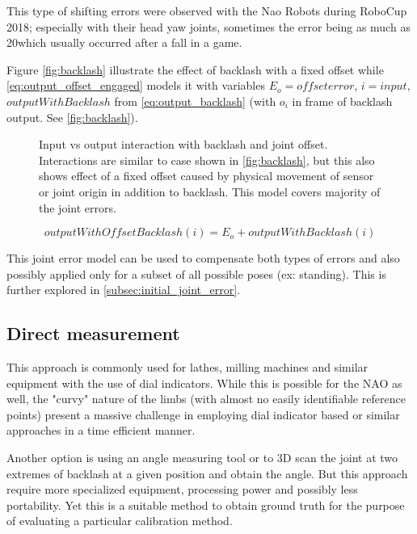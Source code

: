 \documentclass[english, printversion, nomenclature, notitle]{tuvisionthesis} %
\begin{document}
This type of shifting errors were observed with the Nao Robots during RoboCup 2018; especially with their head yaw joints, sometimes the error being as much as 20\degree which usually occurred after a fall in a game. 

Figure \ref{fig:backlash} illustrate the effect of backlash with a fixed offset while \cref{eq:output_offset_engaged} models it with variables $E_o = offset error$, $i = input$, $outputWithBacklash$ from \cref{eq:output_backlash} (with $o_i$ in frame of backlash output. See \cref{fig:backlash}).

\begin{figure}
	\def\svgwidth{\linewidth}
	
	\caption{Input vs output interaction with backlash and joint offset. Interactions are similar to case shown in \ref{fig:backlash}, but this also shows effect of a fixed offset caused by physical movement of sensor or joint origin in addition to backlash. This model covers majority of the joint errors.}
	\label{fig:backlash_offset}
\end{figure}

\begin{equation}
outputWithOffsetBacklash(i) = E_o + outputWithBacklash(i)
\label{eq:output_offset_engaged}
\end{equation}

This joint error model can be used to compensate both types of errors and also possibly applied only for a subset of all possible poses (ex: standing). This is further explored in \cref{subsec:initial_joint_error}.

\subsection{Direct measurement}

This approach is commonly used for lathes, milling machines and similar equipment with the use of dial indicators. While this is possible for the NAO as well, the "curvy" nature of the limbs (with almost no easily identifiable reference points) present a massive challenge in employing dial indicator based or similar approaches in a time efficient manner.

Another option is using an angle measuring tool or to 3D scan the joint at  two extremes of backlash at a given position and obtain the angle. But this approach require more specialized equipment, processing power and possibly less portability. Yet this is a suitable method to obtain ground truth for the purpose of evaluating a particular calibration method. 
\end{document}

